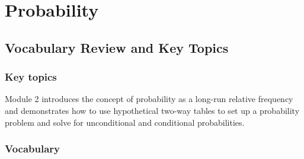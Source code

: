 \documentclass[
]{report}
\begin{document}
\newpage

\chapter{Probability}\label{probability}

\section{Vocabulary Review and Key Topics}\label{vocabulary-review-and-key-topics-1}

\subsection{Key topics}\label{key-topics-1}

Module 2 introduces the concept of probability as a long-run relative frequency and demonstrates how to use hypothetical two-way tables to set up a probability problem and solve for unconditional and conditional probabilities.

\subsection{Vocabulary}\label{vocabulary-1}
\end{document}

